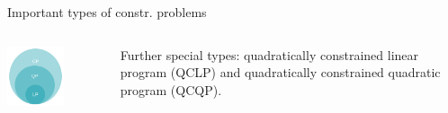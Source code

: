 \documentclass[11pt,compress,t,notes=noshow, xcolor=table]{beamer}
\begin{document}
\begin{vbframe}{Important types of constr. problems}
\vspace*{-0.6cm}

\begin{columns}[T] %
	\begin{column}{.58\textwidth}
		\begin{center}
			\includegraphics[width=0.6\textwidth]{figure_man/classes_optimization_problems.png} 
		\end{center}
	\end{column}
	\begin{column}{.38\textwidth} \vspace*{1.5cm}
		\begin{footnotesize}
		Further special types: quadratically constrained linear program (QCLP) and quadratically constrained quadratic program (QCQP). 
		\end{footnotesize}
	\end{column}
\end{columns}





\end{vbframe}
\end{document}
